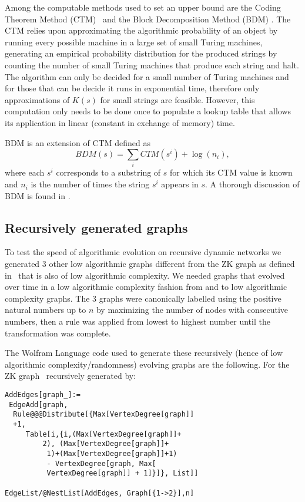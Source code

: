 \documentclass[10pt]{article}
\begin{document}
Among the computable methods used to set an upper bound are the Coding Theorem Method (CTM)~\cite{zenil3,zenil4,solerzenil} and the Block Decomposition Method (BDM) \cite{Zenil14, zenil2016decomposition}. The CTM relies upon approximating the algorithmic probability of an object by running every possible machine in a large set of small Turing machines, generating an empirical probability distribution for the produced strings by counting the number of small Turing machines that produce each string and halt. The algorithm can only be decided for a small number of Turing machines and for those that can be decide it runs in exponential time, therefore only approximations of $K(s)$ for small strings are feasible. However, this computation only needs to be done once to populate a lookup table that allows its application in linear (constant in exchange of memory) time.

BDM is an extension of CTM defined as $$BDM(s)=\sum_i CTM(s^i) + \log (n_i),$$ where each $s^i$ corresponds to a substring of $s$ for which its CTM value is known and $n_i$ is the number of times the string $s^i$ appears in $s$. A thorough discussion of BDM is found in \cite{zenil2016decomposition}.


\subsection*{Recursively generated graphs}

To test the speed of algorithmic evolution on recursive dynamic networks we generated 3 other low algorithmic graphs different from the ZK graph as defined in~\cite{zenil2017low} that is also of low algorithmic complexity. We needed graphs that evolved over time in a low algorithmic complexity fashion from and to low algorithmic complexity graphs. The 3 graphs were canonically labelled using the positive natural numbers up to $n$ by maximizing the number of nodes with consecutive numbers, then a rule was applied from lowest to highest number until the transformation was complete.

The Wolfram Language code used to generate these recursively (hence of low algorithmic complexity/randomness) evolving graphs are the following. For the ZK graph~\cite{zenil2017low}  recursively generated by:

\begin{verbatim}
AddEdges[graph_]:= 
 EdgeAdd[graph, 
  Rule@@@Distribute[{Max[VertexDegree[graph]]
  +1, 
     Table[i,{i,(Max[VertexDegree[graph]]+
         2), (Max[VertexDegree[graph]]+
          1)+(Max[VertexDegree[graph]]+1)
          - VertexDegree[graph, Max[
          VertexDegree[graph]] + 1]}]}, List]]
        
EdgeList/@NestList[AddEdges, Graph[{1->2}],n]
\end{verbatim}
\end{document}
